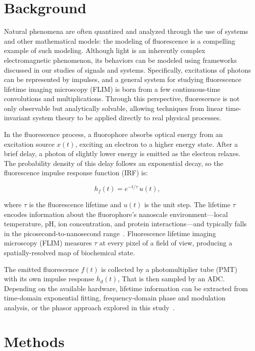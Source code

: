 \documentclass[conference]{IEEEtran}
\begin{document}
\section{Background}

Natural phenomena are often quantized and analyzed through the use of
systems and other mathematical models: the modeling of fluorescence is a
compelling example of such modeling.
Although light is an inherently complex electromagnetic phenomenon, its
behaviors can be modeled using frameworks discussed in our studies of
signals and systems.
Specifically, excitations of photons can be represented by impulses, and
a general system for studying fluorescence lifetime imaging microscopy
(FLIM) is born from a few continuous-time convolutions and
multiplications.
Through this perspective, fluorescence is not only observable but
analytically solvable, allowing techniques from linear time-invariant
system theory to be applied directly to real physical processes.

In the fluorescence process, a fluorophore absorbs optical energy from
an excitation source $x(t)$, exciting an electron to a higher energy
state.
After a brief delay, a photon of slightly lower energy is emitted as the
electron relaxes.
The probability density of this delay follows an exponential decay, so
the fluorescence impulse response function (IRF) is:

\begin{equation}
    h_f(t) = e^{-t/\tau}\,u(t),
    \label{eq:hf}
\end{equation}

where $\tau$ is the fluorescence lifetime and $u(t)$ is the unit step.
The lifetime $\tau$ encodes information about the fluorophore's
nanoscale environment---local temperature, pH, ion concentration, and
protein interactions---and typically falls in the picosecond-to-nanosecond
range~\cite{Datta2020}.
Fluorescence lifetime imaging microscopy (FLIM) measures $\tau$ at
every pixel of a field of view, producing a spatially-resolved map of
biochemical state.

The emitted fluorescence $f(t)$ is collected by a photomultiplier
tube (PMT) with its own impulse response $h_d(t)$, That is then sampled by an ADC.
Depending on the available hardware, lifetime information can be
extracted from time-domain exponential fitting, frequency-domain phase
and modulation analysis, or the phasor approach explored in this
study~\cite{Gadella1993,Digman2008}.

\section{Methods}
\end{document}
